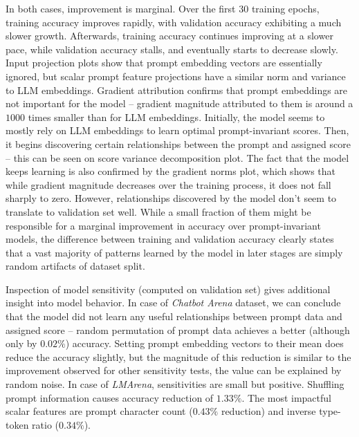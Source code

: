 \documentclass[a4paper,11pt,twoside]{report}
\theoremstyle{definition}
\begin{document}
In both cases, improvement is marginal. Over the first 30 training epochs, training accuracy improves rapidly, with validation accuracy exhibiting a much slower growth. Afterwards, training accuracy continues improving at a slower pace, while validation accuracy stalls, and eventually starts to decrease slowly. Input projection plots show that prompt embedding vectors are essentially ignored, but scalar prompt feature projections have a similar norm and variance to LLM embeddings. Gradient attribution confirms that prompt embeddings are not important for the model -- gradient magnitude attributed to them is around a $1000$ times smaller than for LLM embeddings. Initially, the model seems to mostly rely on LLM embeddings to learn optimal prompt-invariant scores. Then, it begins discovering certain relationships between the prompt and assigned score -- this can be seen on score variance decomposition plot. The fact that the model keeps learning is also confirmed by the gradient norms plot, which shows that while gradient magnitude decreases over the training process, it does not fall sharply to zero. However, relationships discovered by the model don't seem to translate to validation set well. While a small fraction of them might be responsible for a marginal improvement in accuracy over prompt-invariant models, the difference between training and validation accuracy clearly states that a vast majority of patterns learned by the model in later stages are simply random artifacts of dataset split.

Inspection of model sensitivity (computed on validation set) gives additional insight into model behavior. In case of \textit{Chatbot Arena} dataset, we can conclude that the model did not learn any useful relationships between prompt data and assigned score -- random permutation of prompt data achieves a better (although only by $0.02 \%$) accuracy. Setting prompt embedding vectors to their mean does reduce the accuracy slightly, but the magnitude of this reduction is similar to the improvement observed for other sensitivity tests, the value can be explained by random noise. In case of \textit{LMArena}, sensitivities are small but positive. Shuffling prompt information causes accuracy reduction of $1.33 \%$. The most impactful scalar features are prompt character count ($0.43 \%$ reduction) and inverse type-token ratio ($0.34 \%$).
\end{document}
